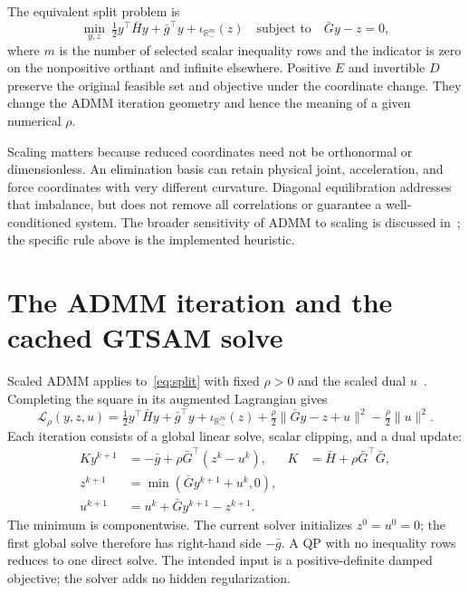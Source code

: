 \documentclass[11pt,letterpaper]{article}
\newcommand{\R}{\mathbb{R}}
\begin{document}
The equivalent split problem is
\begin{equation}
  \min_{y,z}\ \tfrac12 y^\top\bar H y+\bar g^\top y
       +\iota_{\R_-^m}(z)
  \quad\text{subject to}\quad \bar G y-z=0,
  \label{eq:split}
\end{equation}
where $m$ is the number of selected scalar inequality rows and the indicator
is zero on the nonpositive orthant and infinite elsewhere. Positive $E$ and
invertible $D$ preserve the original feasible set and objective under the
coordinate change. They change the ADMM iteration geometry and hence the
meaning of a given numerical $\rho$.

Scaling matters because reduced coordinates need not be orthonormal or
dimensionless. An elimination basis can retain physical joint, acceleration,
and force coordinates with very different curvature. Diagonal equilibration
addresses that imbalance, but does not remove all correlations or guarantee
a well-conditioned system. The broader sensitivity of ADMM to scaling is
discussed in~\cite{scaling}; the specific rule above is the implemented heuristic.

\newpage
\section{The ADMM iteration and the cached GTSAM solve}
Scaled ADMM applies to~\eqref{eq:split} with fixed $\rho>0$ and the scaled
dual $u$~\cite{admm}. Completing the square in its augmented Lagrangian gives
\begin{equation}
  \mathcal L_\rho(y,z,u)=\tfrac12y^\top\bar H y+\bar g^\top y
   +\iota_{\R_-^m}(z)+\tfrac\rho2\|\bar Gy-z+u\|^2
   -\tfrac\rho2\|u\|^2.
\end{equation}
Each iteration consists of a global linear solve, scalar clipping, and a
dual update:
\begin{align}
  K y^{k+1}&=-\bar g+\rho\bar G^\top(z^k-u^k),
       &K&=\bar H+\rho\bar G^\top\bar G,\label{eq:global}\\
  z^{k+1}&=\min(\bar G y^{k+1}+u^k,0),&&\label{eq:clip}\\
  u^{k+1}&=u^k+\bar G y^{k+1}-z^{k+1}.&&\label{eq:dual}
\end{align}
The minimum is componentwise. The current solver initializes $z^0=u^0=0$;
the first global solve therefore has right-hand side $-\bar g$. A QP with
no inequality rows reduces to one direct solve. The intended input is a
positive-definite damped objective; the solver adds no hidden regularization.
\end{document}
